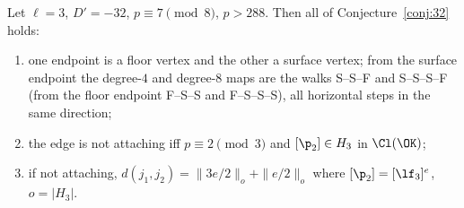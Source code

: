 \begin{theorem}\label{thm:A32}
Let $\ell=3$, $D'=-32$, $p\equiv7\pmod8$, $p>288$.  Then all of Conjecture~\ref{conj:32} holds:
\begin{enumerate}[label=(\alph*)]
\item one endpoint is a floor vertex and the other a surface vertex; from the surface endpoint the degree-$4$ and degree-$8$ maps are
  the walks S--S--F and S--S--S--F (from the floor endpoint F--S--S and F--S--S--S), all horizontal steps in the same direction;
\item the edge is not attaching iff $p\equiv2\pmod3$ and $[\p_2]\in H_3$ in $\Cl(\OK)$;
\item if not attaching, $d(j_1,j_2)=\|3e/2\|_o+\|e/2\|_o$ where $[\p_2]=[\lf_3]^e$, $o=|H_3|$.
\end{enumerate}
\end{theorem}
